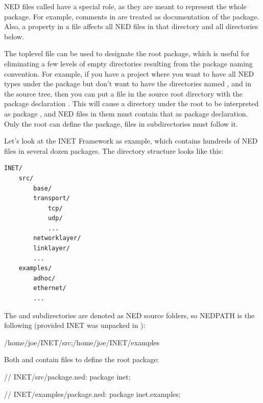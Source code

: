 NED files called  have a special role, as they are meant
to represent the whole package. For example, comments in
 are treated as documentation of the package. Also, a
 property in a  file affects all NED
files in that directory and all directories below.

The toplevel  file can be used to designate the root
package, which is useful for eliminating a few levels of empty directories
resulting from the package naming convention. For example, if you have a
project where you want to have all NED types under the 
package but don't want to have the directories named ,  and
 in the source tree, then you can put a 
file in the source root directory with the package declaration
. This will cause a directory  under the
root to be interpreted as package , and NED
files in them must contain that as package declaration. Only the root
 can define the package,  files
in subdirectories must follow it.

Let's look at the INET Framework as example, which contains hundreds of NED
files in several dozen packages. The directory structure looks like this:

\begin{Verbatim}
INET/
    src/
        base/
        transport/
            tcp/
            udp/
            ...
        networklayer/
        linklayer/
        ...
    examples/
        adhoc/
        ethernet/
        ...
\end{Verbatim}

The  and  subdirectories are denoted as NED source
folders, so NEDPATH is the following (provided INET was unpacked in
):

\begin{filelisting}
/home/joe/INET/src;/home/joe/INET/examples
\end{filelisting}

Both  and  contain  files to
define the root package:

\begin{ned}
// INET/src/package.ned:
package inet;
\end{ned}

\begin{ned}
// INET/examples/package.ned:
package inet.examples;
\end{ned}


